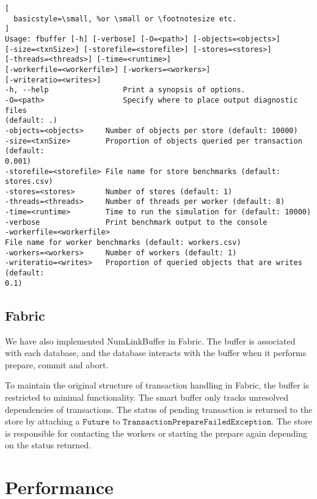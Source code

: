 \documentclass{article}
\begin{document}
\begin{lstlisting}[
  basicstyle=\small, %or \small or \footnotesize etc.
]
Usage: fbuffer [-h] [-verbose] [-O=<path>] [-objects=<objects>]
[-size=<txnSize>] [-storefile=<storefile>] [-stores=<stores>]
[-threads=<threads>] [-time=<runtime>]
[-workerfile=<workerfile>] [-workers=<workers>]
[-writeratio=<writes>]
-h, --help                 Print a synopsis of options.
-O=<path>                  Specify where to place output diagnostic files
(default: .)
-objects=<objects>     Number of objects per store (default: 10000)
-size=<txnSize>        Proportion of objects queried per transaction (default:
0.001)
-storefile=<storefile> File name for store benchmarks (default: stores.csv)
-stores=<stores>       Number of stores (default: 1)
-threads=<threads>     Number of threads per worker (default: 8)
-time=<runtime>        Time to run the simulation for (default: 10000)
-verbose               Print benchmark output to the console
-workerfile=<workerfile>
File name for worker benchmarks (default: workers.csv)
-workers=<workers>     Number of workers (default: 1)
-writeratio=<writes>   Proportion of queried objects that are writes (default:
0.1)
\end{lstlisting}


\subsection{Fabric}
We have also implemented NumLinkBuffer in Fabric. The buffer is associated with
each database, and the database interacts with the buffer when it performs
prepare, commit and abort.

To maintain the original structure of transaction handling in Fabric, the buffer
is restricted to minimal functionality. The smart buffer only tracks unresolved
dependencies of transactions. The status of pending transaction is returned to
the store by attaching a $\mathtt{Future}$ to
$\mathtt{TransactionPrepareFailedException}$. The store is responsible for
contacting the workers or starting the prepare again depending on the status
returned.

\section{Performance}
\label{sec:performance}
\end{document}
